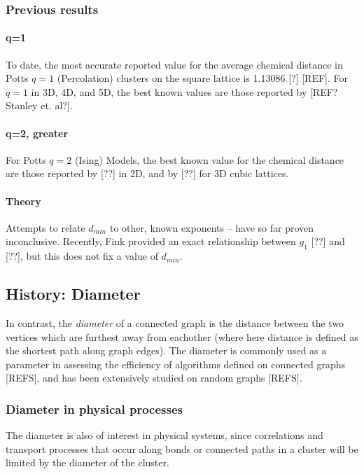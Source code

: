 \documentclass{article}
\begin{document}
\subsubsection{Previous results}
\label{sec-1.2.1}
\paragraph{q=1}
\label{sec-1.2.1.1}

To date, the most accurate reported value for the average chemical distance in Potts $q=1$ (Percolation) clusters on the square lattice is 1.13086 [?] [REF].  For $q=1$ in 3D, 4D, and 5D, the best known values are those reported by [REF? Stanley et. al?].  
\paragraph{q=2, greater}
\label{sec-1.2.1.2}

For Potts $q=2$ (Ising) Models, the best known value for the chemical distance are those reported by [??] in 2D, and by [??] for 3D cubic lattices.
\paragraph{Theory}
\label{sec-1.2.1.3}

Attempts to relate $d_{min}$ to other, known exponents -- have so far proven inconclusive.  Recently, Fink provided an exact relationship between $g_1$ [??] and [??], but this does not fix a value of $d_{min}$. 
\subsection{History: Diameter}
\label{sec-1.3}

In contrast, the \emph{diameter} of a connected graph is the distance between the two vertices which are furthest away from eachother (where here distance is defined as the shortest path along graph edges).   The diameter is commonly used as a parameter in assessing the efficiency of algorithms defined on connected graphs [REFS], and has been extensively studied on random graphs [REFS].
\subsubsection{Diameter in physical processes}
\label{sec-1.3.1}

The diameter is also of interest in physical systems, since correlations and transport processes that occur along bonds or connected paths in a cluster will be limited by the diameter of the cluster.  
\end{document}
